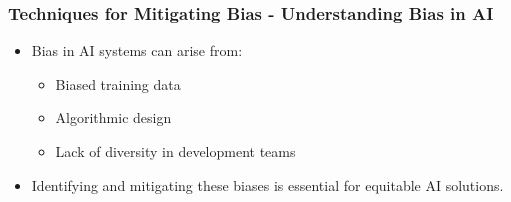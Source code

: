 \documentclass{beamer}
\begin{document}
\begin{frame}[fragile]
    \frametitle{Techniques for Mitigating Bias - Understanding Bias in AI}
    \begin{itemize}
        \item Bias in AI systems can arise from:
        \begin{itemize}
            \item Biased training data
            \item Algorithmic design
            \item Lack of diversity in development teams
        \end{itemize}
        \item Identifying and mitigating these biases is essential for equitable AI solutions.
    \end{itemize}
\end{frame}
\end{document}
